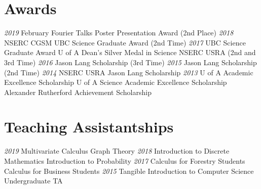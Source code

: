 \documentclass[a4paper]{cv-friggeri}
\begin{document}





\begin{asidenotit}
\section{Awards}
\emph{2019}
February Fourier Talks Poster Presentation Award (2nd Place)
\emph{2018}
NSERC CGSM
UBC Science Graduate Award
(2nd Time)
\emph{2017}
UBC Science Graduate Award
U of A Dean's Silver Medal in Science
NSERC USRA
(2nd and 3rd Time)
\emph{2016}
Jason Lang Scholarship
(3rd Time)
\emph{2015}
Jason Lang Scholarship
(2nd Time)
\emph{2014}
NSERC USRA
Jason Lang Scholarship
\emph{2013}
U of A Academic Excellence Scholarship
U of A Science Academic Excellence Scholarship
Alexander Rutherford Achievement Scholarship
~
\section{Teaching Assistantships}
\emph{2019}
Multivariate Calculus
Graph Theory
\emph{2018}
Introduction to Discrete Mathematics
Introduction to Probability
\emph{2017}
Calculus for Forestry Students
Calculus for Business Students
\emph{2015}
Tangible Introduction to Computer Science Undergraduate TA
\end{asidenotit}
\end{document}

